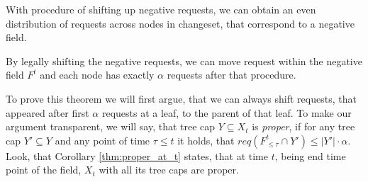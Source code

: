 
With procedure of shifting up negative requests, we can obtain an even 
distribution of requests across nodes in changeset, that  correspond to 
a negative field.
\begin{theorem}
By legally shifting the negative requests, we can move request within the 
negative field $F^t$ and each node has exactly $\alpha$ requests after that 
procedure.
\label{thm:legal_shifting_up}
\end{theorem}
To prove this theorem we will first argue, that we can always 
shift requests, that appeared after first $\alpha$ requests at a leaf, to the 
parent of that leaf. To make our argument transparent, we will say, that tree 
cap $Y \subseteq X_t$ is \textit{proper}, if for any tree cap $Y' \subseteq Y$ 
and any point of time $\tau \leq t$ it holds, that 
$req(F^t_{\leq \tau} \cap Y') \leq |Y'| \cdot \alpha$. Look, that Corollary 
\ref{thm:proper_at_t} states, that at time $t$, being end time point of the 
field, $X_t$ with all its tree caps are proper.

